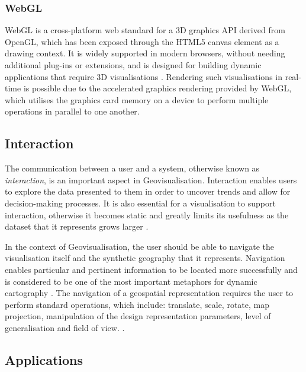 \documentclass[
	fontsize=11pt
	headlines=2,
	footlines=2,
	parskip=half
]{scrartcl}
\begin{document}
{{{			}

			\subsubsection{WebGL} {

				WebGL is a cross-platform web standard for a 3D graphics API derived from OpenGL, which has been exposed through the HTML5 canvas element \citep{marrin2011webgl} as a drawing context. It is widely supported in modern browsers, without needing additional plug-ins or extensions, and is designed for building dynamic applications that require 3D visualisations \citep{chaturvedi2015web, marrin2011webgl, parisi2012webgl}. Rendering such visualisations in real-time is possible due to the accelerated graphics rendering provided by WebGL, which utilises the graphics card memory on a device \citep{chaturvedi2015web} to perform multiple operations in parallel to one another.

			}

		}

		\subsection{Interaction} {

			The communication between a user and a system, otherwise known as \emph{interaction}, is an important aspect in Geovisualisation. Interaction enables users to explore the data presented to them in order to uncover trends and allow for decision-making processes. It is also essential for a visualisation to support interaction, otherwise it becomes static and greatly limits its usefulness as the dataset that it represents grows larger \citep{yi2007toward}.

			In the context of Geovisualisation, the user should be able to navigate the visualisation itself and the synthetic geography that it represents. Navigation enables particular and pertinent information to be located more successfully and is considered to be one of the most important metaphors for dynamic cartography \citep{cartwright2001geospatial}. The navigation of a geospatial representation requires the user to perform standard operations, which include: translate, scale, rotate, map projection, manipulation of the design representation parameters, level of generalisation and field of view. \citep{cartwright2001geospatial, hand1997survey}.

		}

		\subsection{Applications} {



}}
\end{document}
